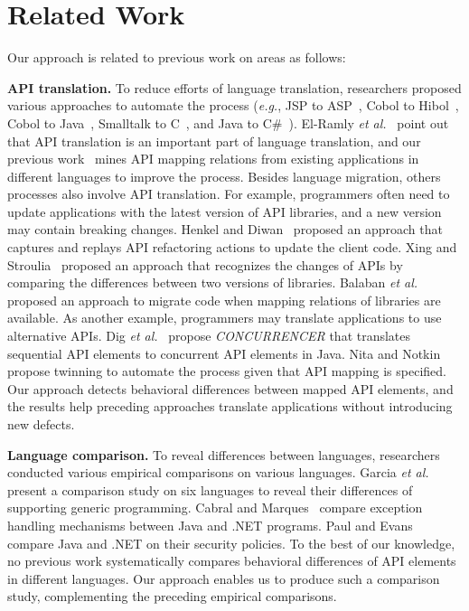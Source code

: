 \section{Related Work}
\label{sec:related}

Our approach is related to previous work on areas as follows:

\textbf{API translation.} To reduce efforts of language translation, researchers proposed various
approaches to automate the process (\emph{e.g.}, JSP to ASP~\cite{hassan2005lightweight}, Cobol to Hibol~\cite{waters1988program}, Cobol to Java~\cite{mossienko2003automated}, Smalltalk to C~\cite{yasumatsu1995spice}, and Java to C\#~\cite{el2006experiment}). El-Ramly \emph{et al.}~\cite{el2006experiment} point out that API translation is an important part of language translation, and our previous work~\cite{zhong2010mining} mines API mapping relations from existing applications in different languages to improve the process. Besides language migration, others processes also involve API translation. For example, programmers often need to update applications with the latest version of API libraries, and a new version may contain breaking changes. Henkel and Diwan~\cite{henkel2005catchup} proposed an approach that captures and replays API refactoring actions to update the client code. Xing and Stroulia~\cite{xing2007api} proposed an approach that recognizes the changes of APIs by comparing the differences between two versions of libraries. Balaban \emph{et al.}~\cite{balaban2005refactoring} proposed an approach to migrate code when mapping relations of libraries are available. As another example, programmers may translate applications to use alternative APIs. Dig \emph{et al.}~\cite{dig2009refactoring} propose \emph{CONCURRENCER} that translates sequential API elements to concurrent API elements in Java. Nita and Notkin~\cite{nita2010using} propose twinning to automate the process given that API mapping is specified. Our approach detects behavioral differences between mapped API elements, and the results help preceding approaches translate applications without introducing new defects.

\textbf{Language comparison.} To reveal differences between languages, researchers conducted various empirical comparisons on various languages. Garcia \emph{et al.}~\cite{Garcia2003} present a comparison study on six languages to reveal their differences of supporting generic programming. Cabral and Marques~\cite{cabral2007exception} compare exception handling mechanisms between Java and .NET programs. Paul and Evans~\cite{paul2006comparing} compare Java and .NET on their security policies. To the best of our knowledge, no previous work systematically compares behavioral differences of API elements in different languages. Our approach enables us to produce such a comparison study, complementing the preceding empirical comparisons.

